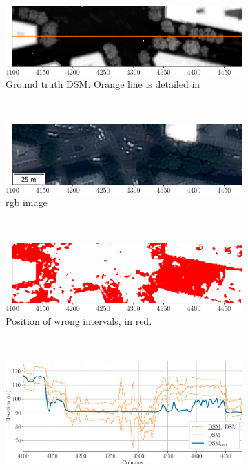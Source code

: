 \begin{figure}
    \centering
    \begin{subfigure}[t]{\linewidth}
        \flushright
        \includegraphics[width=0.95\linewidth]{Images/Chap_6/paris_error_tree_gt.png}
        \caption{Ground truth DSM. Orange line is detailed in }
        \label{fig:paris_error_tree_gt}
    \end{subfigure}\\
    \begin{subfigure}[t]{\linewidth}
        \flushright
        \includegraphics[width=0.95\linewidth]{Images/Chap_6/paris_error_tree_clr.png}
        \caption{\acrshort{rgb} image}
        \label{fig:paris_error_tree_clr}
    \end{subfigure}\\
    \begin{subfigure}[t]{\linewidth}
        \flushright
        \includegraphics[width=0.95\linewidth]{Images/Chap_6/paris_error_tree_intervals.png}
        \caption{Position of wrong intervals, in red.}
        \label{fig:paris_error_tree_intervals}
    \end{subfigure}\\
    \begin{subfigure}[t]{\linewidth}
        \centering
        \includegraphics[width=\linewidth]{Images/Chap_6/paris_error_tree.png}

\end{subfigure}
\end{figure}
